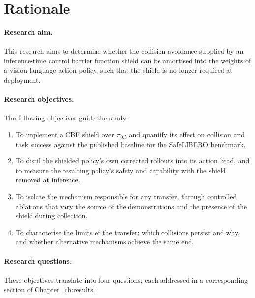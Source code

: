 \documentclass[a4paper,11pt]{report}
\begin{document}
\section{Rationale}\label{sec:intro:rationale}

\paragraph{Research aim.}
This research aims to determine whether the collision avoidance supplied by an inference-time
control barrier function shield can be amortised into the weights of a vision-language-action
policy, such that the shield is no longer required at deployment.

\paragraph{Research objectives.}
The following objectives guide the study:

\begin{enumerate}[leftmargin=*, topsep=3pt, itemsep=2pt, parsep=0pt]
  \item To implement a CBF shield over $\pi_{0.5}$ and quantify its effect on collision and task
        success against the published baseline for the SafeLIBERO benchmark.
  \item To distil the shielded policy's own corrected rollouts into its action head, and to measure
        the resulting policy's safety and capability with the shield removed at inference.
  \item To isolate the mechanism responsible for any transfer, through controlled ablations that
        vary the source of the demonstrations and the presence of the shield during collection.
  \item To characterise the limits of the transfer: which collisions persist and why, and whether
        alternative mechanisms achieve the same end.
\end{enumerate}

\paragraph{Research questions.}
These objectives translate into four questions, each addressed in a corresponding section of
Chapter~\ref{ch:results}:
\end{document}
